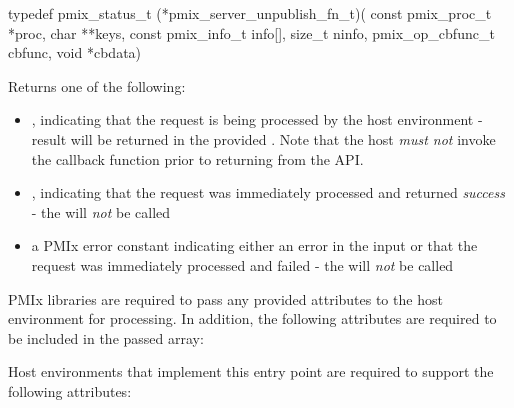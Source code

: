 \format

\cspecificstart
\begin{codepar}
typedef pmix_status_t (*pmix_server_unpublish_fn_t)(
                             const pmix_proc_t *proc,
                             char **keys,
                             const pmix_info_t info[],
                             size_t ninfo,
                             pmix_op_cbfunc_t cbfunc,
                             void *cbdata)
\end{codepar}
\cspecificend

\begin{arglist}
\end{arglist}

Returns one of the following:

\begin{itemize}
    \item {}, indicating that the request is being processed by the host environment - result will be returned in the provided . Note that the host \emph{must not} invoke the callback function prior to returning from the \ac{API}.
    \item {}, indicating that the request was immediately processed and returned \textit{success} - the  will \textit{not} be called
    \item a PMIx error constant indicating either an error in the input or that the request was immediately processed and failed - the  will \textit{not} be called
\end{itemize}

\reqattrstart
\ac{PMIx} libraries are required to pass any provided attributes to the host environment for processing. In addition, the following attributes are required to be included in the passed  array:


Host environments that implement this entry point are required to support the following attributes:

